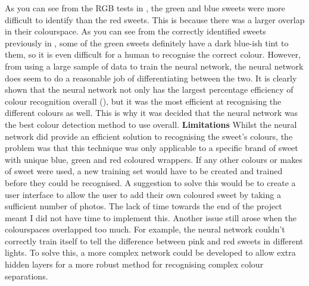 As you can see from the RGB tests in \textbf{}, the green and blue sweets were more difficult to identify than the red sweets. This is because there was a larger overlap in their colourspace. As you can see from the correctly identified sweets previously in \textbf{}, some of the green sweets definitely have a dark blue-ish tint to them, so it is even difficult for a human to recognise the correct colour. However, from using a large sample of data to train the neural network, the neural network does seem to do a reasonable job of differentiating between the two. It is clearly shown that the neural network not only has the largest percentage efficiency of colour recognition overall (\textbf{}), but it was the most efficient at recognising the different colours as well. This is why it was decided that the neural network was the best colour detection method to use overall.
\newline\newline
\textbf{Limitations}\newline
Whilst the neural network did provide an efficient solution to recognising the sweet's colours, the problem was that this technique was only applicable to a specific brand of sweet with unique blue, green and red coloured wrappers. If any other colours or makes of sweet were used, a new training set would have to be created and trained before they could be recognised. A suggestion to solve this would be to create a user interface to allow the user to add their own coloured sweet by taking a sufficient number of photos. The lack of time towards the end of the project meant I did not have time to implement this. Another issue still arose when the colourspaces overlapped too much. For example, the neural network couldn't correctly train itself to tell the difference between pink and red sweets in different lights. To solve this, a more complex network could be developed to allow extra hidden layers for a more robust method for recognising complex colour separations.
